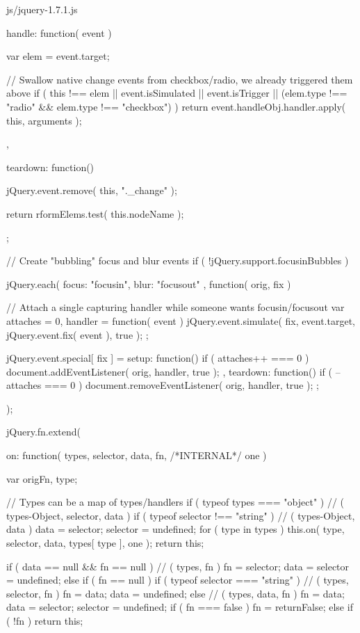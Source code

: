 \documentclass{article}
\begin{document}
\begin{chunk}{js/jquery-1.7.1.js}
{{{		handle: function( event ) {
			var elem = event.target;

			// Swallow native change events from checkbox/radio, we already triggered them above
			if ( this !== elem || event.isSimulated || event.isTrigger || (elem.type !== "radio" && elem.type !== "checkbox") ) {
				return event.handleObj.handler.apply( this, arguments );
			}
		},

		teardown: function() {
			jQuery.event.remove( this, "._change" );

			return rformElems.test( this.nodeName );
		}
	};
}

// Create "bubbling" focus and blur events
if ( !jQuery.support.focusinBubbles ) {
	jQuery.each({ focus: "focusin", blur: "focusout" }, function( orig, fix ) {

		// Attach a single capturing handler while someone wants focusin/focusout
		var attaches = 0,
			handler = function( event ) {
				jQuery.event.simulate( fix, event.target, jQuery.event.fix( event ), true );
			};

		jQuery.event.special[ fix ] = {
			setup: function() {
				if ( attaches++ === 0 ) {
					document.addEventListener( orig, handler, true );
				}
			},
			teardown: function() {
				if ( --attaches === 0 ) {
					document.removeEventListener( orig, handler, true );
				}
			}
		};
	});
}

jQuery.fn.extend({

	on: function( types, selector, data, fn, /*INTERNAL*/ one ) {
		var origFn, type;

		// Types can be a map of types/handlers
		if ( typeof types === "object" ) {
			// ( types-Object, selector, data )
			if ( typeof selector !== "string" ) {
				// ( types-Object, data )
				data = selector;
				selector = undefined;
			}
			for ( type in types ) {
				this.on( type, selector, data, types[ type ], one );
			}
			return this;
		}

		if ( data == null && fn == null ) {
			// ( types, fn )
			fn = selector;
			data = selector = undefined;
		} else if ( fn == null ) {
			if ( typeof selector === "string" ) {
				// ( types, selector, fn )
				fn = data;
				data = undefined;
			} else {
				// ( types, data, fn )
				fn = data;
				data = selector;
				selector = undefined;
			}
		}
		if ( fn === false ) {
			fn = returnFalse;
		} else if ( !fn ) {
			return this;
		}

}}}
\end{chunk}
\end{document}
